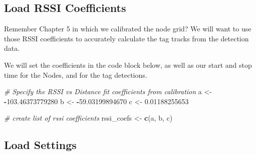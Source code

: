 \documentclass[
]{book}
\newenvironment{Shaded}{\begin{snugshade}}{\end{snugshade}}
\newcommand{\CommentTok}[1]{\textcolor[rgb]{0.56,0.35,0.01}{\textit{#1}}}
\newcommand{\FloatTok}[1]{\textcolor[rgb]{0.00,0.00,0.81}{#1}}
\newcommand{\FunctionTok}[1]{\textcolor[rgb]{0.13,0.29,0.53}{\textbf{#1}}}
\newcommand{\NormalTok}[1]{#1}
\newcommand{\OtherTok}[1]{\textcolor[rgb]{0.56,0.35,0.01}{#1}}
\newcommand{\SpecialCharTok}[1]{\textcolor[rgb]{0.81,0.36,0.00}{\textbf{#1}}}
\begin{document}
\subsection{Load RSSI Coefficients}\label{load-rssi-coefficients}

Remember Chapter 5 in which we calibrated the node grid? We will want to use those RSSI coefficients to accurately calculate the tag tracks from the detection data.

We will set the coefficients in the code block below, as well as our start and stop time for the Nodes, and for the tag detections.

\begin{Shaded}
\begin{Highlighting}[]
\CommentTok{\# Specify the RSSI vs Distance fit coefficients from calibration}
\NormalTok{a }\OtherTok{\textless{}{-}} \SpecialCharTok{{-}}\FloatTok{103.46373779280}
\NormalTok{b }\OtherTok{\textless{}{-}} \SpecialCharTok{{-}}\FloatTok{59.03199894670}
\NormalTok{c }\OtherTok{\textless{}{-}} \FloatTok{0.01188255653}

\CommentTok{\# create list of rssi coefficients}
\NormalTok{rssi\_coefs }\OtherTok{\textless{}{-}} \FunctionTok{c}\NormalTok{(a, b, c)}
\end{Highlighting}
\end{Shaded}

\subsection{Load Settings}\label{load-settings-2}
\end{document}
